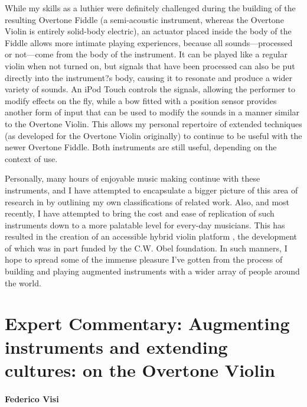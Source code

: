 While my skills as a luthier were definitely challenged during the building of the resulting Overtone Fiddle \cite{Overholt:2011a} (a semi-acoustic instrument, whereas the Overtone Violin is entirely solid-body electric), an actuator placed inside the body of the Fiddle allows more intimate playing experiences, because all sounds---processed or not---come from the body of the instrument. It can be played like a regular violin when not turned on, but signals that have been processed can also be put directly into the instrument?s body, causing it to resonate and produce a wider variety of sounds. An iPod Touch controls the signals, allowing the performer to modify effects on the fly, while a bow fitted with a position sensor provides another form of input that can be used to modify the sounds in a manner similar to the Overtone Violin. This allows my personal repertoire of extended techniques (as developed for the Overtone Violin originally) to continue to be useful with the newer Overtone Fiddle. Both instruments are still useful, depending on the context of use.

Personally, many hours of enjoyable music making continue with these instruments, and I have attempted to encapsulate a bigger picture of this area of research in \cite{Overholt:2012} by outlining my own classifications of related work. Also, and most recently, I have attempted to bring the cost and ease of replication of such instruments down to a more palatable level for every-day musicians. This has resulted in the creation of an accessible hybrid violin platform \cite{Overholt:2014}, the development of which was in part funded by the C.W. Obel foundation. In such manners, I hope to spread some of the immense pleasure I've gotten from the process of building and playing augmented instruments with a wider array of people around the world.

\section*{Expert Commentary: Augmenting instruments and extending cultures: on the Overtone Violin}
\paragraph{Federico Visi}


